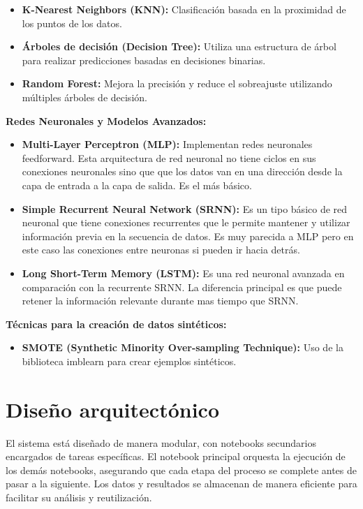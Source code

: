   \begin{itemize}
  \tightlist
  \item
   \textbf{K-Nearest Neighbors (KNN):} Clasificación basada en la proximidad de los puntos de los datos.
  \item
   \textbf{Árboles de decisión (Decision Tree):} Utiliza una estructura de árbol para realizar predicciones basadas en decisiones binarias.
  \item
   \textbf{Random Forest:} Mejora la precisión y reduce el sobreajuste utilizando múltiples árboles de decisión.
  \end{itemize}   

  \textbf{Redes Neuronales y Modelos Avanzados:}

  \begin{itemize}
  \tightlist
  \item
   \textbf{Multi-Layer Perceptron (MLP):} Implementan redes neuronales feedforward. Esta arquitectura de red neuronal no tiene ciclos en sus conexiones neuronales sino que que los datos van en una dirección desde la capa de entrada a la capa de salida. Es el más básico.
  \item
   \textbf{Simple Recurrent Neural Network (SRNN):} Es un tipo básico de red neuronal que tiene conexiones recurrentes que le permite mantener y utilizar información previa en la secuencia de datos. Es muy parecida a MLP pero en este caso las conexiones entre neuronas si pueden ir hacia detrás.
  \item
   \textbf{Long Short-Term Memory (LSTM):} Es una red neuronal avanzada en comparación con la recurrente SRNN. La diferencia principal es que puede retener la información relevante durante mas tiempo que SRNN.
  \end{itemize} 


  \textbf{Técnicas para la creación de datos sintéticos:}

  \begin{itemize}
  \tightlist
  \item
   \textbf{SMOTE (Synthetic Minority Over-sampling Technique):} Uso de la biblioteca imblearn para crear ejemplos sintéticos.
  \end{itemize}   
  


\section{Diseño arquitectónico}

El sistema está diseñado de manera modular, con notebooks secundarios encargados de tareas específicas. El notebook principal orquesta la ejecución de los demás notebooks, asegurando que cada etapa del proceso se complete antes de pasar a la siguiente. Los datos y resultados se almacenan de manera eficiente para facilitar su análisis y reutilización.

